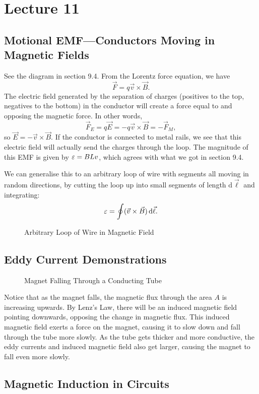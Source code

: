 \documentclass[class=article, crop=false]{standalone}
\begin{document}
  \section{Lecture 11}
  \subsection{Motional EMF---Conductors Moving in Magnetic Fields}
  See the diagram in section 9.4. From the Lorentz force equation, we have
  \[
    \vec{F} = q\vec{v}\times \vec{B}.
  \]
  The electric field generated by the separation of charges (positives to the top, negatives to the bottom) in the conductor will create a force equal to and opposing the magnetic force. In other words, 
  \[
    \vec{F}_E = q\vec{E} = -q\vec{v}\times \vec{B} = -\vec{F}_M,
  \]
  so $\vec{E} = -\vec{v}\times \vec{B}$. If the conductor is connected to metal rails, we see that this electric field will actually send the charges through the loop. The magnitude of this EMF is given by $\varepsilon = BLv$, which agrees with what we got in section 9.4. \par
  We can generalise this to an arbitrary loop of wire with segments all moving in random directions, by cutting the loop up into small segments of length $\mathrm{d}\vec{\ell}$ and integrating:
  \[
    \varepsilon = \oint (\vec{v}\times \vec{B})\,\mathrm{d}\vec{\ell}.
  \]
  \begin{figure}[ht]
    \centering
    \caption{Arbitrary Loop of Wire in Magnetic Field}
  \end{figure}
  \newpage
  \subsection{Eddy Current Demonstrations}
  \begin{figure}[ht]
    \centering
    \caption{Magnet Falling Through a Conducting Tube}
  \end{figure}
  Notice that as the magnet falls, the magnetic flux through the area $A$ is increasing upwards. By Lenz's Law, there will be an induced magnetic field pointing downwards, opposing the change in magnetic flux. This induced magnetic field exerts a force on the magnet, causing it to slow down and fall through the tube more slowly. As the tube gets thicker and more conductive, the eddy currents and induced magnetic field also get larger, causing the magnet to fall even more slowly.
  \subsection{Magnetic Induction in Circuits}
\end{document}
